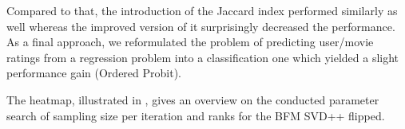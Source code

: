\documentclass[10pt,conference,compsocconf]{IEEEtran}
\begin{document}
    Compared to that, the introduction of the Jaccard index%
    performed similarly as well whereas the improved version of it surprisingly decreased the performance.
    As a final approach, we reformulated the problem of predicting user/movie ratings from a regression problem into a classification one which yielded a slight performance gain (Ordered Probit).

    The heatmap, illustrated in , gives an overview on the conducted parameter search of sampling size per iteration and ranks for the BFM SVD++ flipped.
\end{document}
